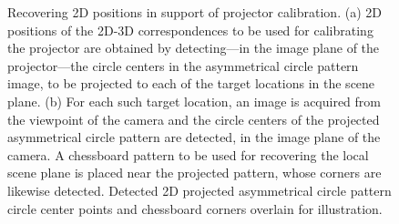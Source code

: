 \documentclass[review]{elsarticle}
\begin{document}
\begin{figure}
    \centering
    \qquad
    \caption{Recovering 2D positions in support of projector calibration. (a) 2D positions of the 2D-3D correspondences to be used for calibrating the projector are obtained by detecting---in the image plane of the projector---the circle centers in the asymmetrical circle pattern image, to be projected to each of the target locations in the scene plane. (b) For each such target location, an image is acquired from the viewpoint of the camera and the circle centers of the projected asymmetrical circle pattern are detected, in the image plane of the camera. A chessboard pattern to be used for recovering the local scene plane is placed near the projected pattern, whose corners are likewise detected. Detected 2D projected asymmetrical circle pattern circle center points and chessboard corners overlain for illustration.}
    \label{fig:2d}
\end{figure}
\end{document}
